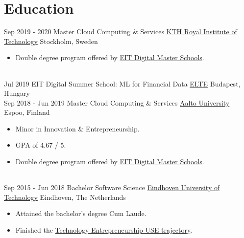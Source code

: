 \documentclass[a4paper]{twentysecondcv} %
\begin{document}
\makeprofile %

\section{Education}

\begin{twenty} %
    \twentyitem
    	{Sep 2019 - }
        {2020}
        {Master Cloud Computing \& Services}
        {\href{https://kth.se/en}{KTH Royal Institute of Technology}}
        {Stockholm, Sweden}
        {
        \begin{itemize}
            \item Double degree program offered by \href{https://masterschool.eitdigital.eu/}{EIT Digital Master Schools}.
        \end{itemize}
        }
    \\
	\twentyitem
    	{Jul 2019}
		{}
        {EIT Digital Summer School: ML for Financial Data}
        {\href{https://www.elte.hu/en/}{ELTE}}
        {Budapest, Hungary}
        {
    	}
    \\
	\twentyitem
    	{Sep 2018 - }
        {Jun 2019}
        {Master Cloud Computing \& Services}
        {\href{https://aalto.fi/}{Aalto University}}
        {Espoo, Finland}
        {
        \begin{itemize}
            \item Minor in Innovation \& Entrepreneurship.
            \item GPA of 4.67 / 5.
            \item Double degree program offered by \href{https://masterschool.eitdigital.eu/}{EIT Digital Master Schools}.
        \end{itemize}
        }
    \\
    \twentyitem
    	{Sep 2015 - }
        {Jun 2018}
        {Bachelor Software Science}
        {\href{https://tue.nl/}{Eindhoven University of Technology}}
        {Eindhoven, The Netherlands}
        {
       	\begin{itemize}
   			\item Attained the bachelor's degree Cum Laude.
            \item Finished the \href{https://web.archive.org/web/20181111084550/https://educationguide.tue.nl/programs/bachelor-college/use-learning-trajectory/technology-entrepreneurship/}{Technology Entrepreneurship USE trajectory}.

\end{itemize}}
\end{twenty}
\end{document}
